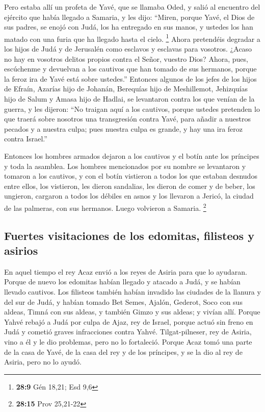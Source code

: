  Pero estaba allí un profeta de Yavé, que se llamaba Oded,
y salió al encuentro del ejército que había llegado a Samaria, y les
dijo: ``Miren, porque Yavé, el Dios de sus padres, se enojó con Judá,
los ha entregado en sus manos, y ustedes los han matado con una furia
que ha llegado hasta el cielo. \footnote{\textbf{28:9} Gén 18,21; Esd
  9,6}  Ahora pretendéis degradar a los hijos de Judá y
de Jerusalén como esclavos y esclavas para vosotros. ¿Acaso no hay en
vosotros delitos propios contra el Señor, vuestro Dios? 
Ahora, pues, escúchenme y devuelvan a los cautivos que han tomado de sus
hermanos, porque la feroz ira de Yavé está sobre ustedes.''
 Entonces algunos de los jefes de los hijos de Efraín,
Azarías hijo de Johanán, Berequías hijo de Meshillemot, Jehizquías hijo
de Salum y Amasa hijo de Hadlai, se levantaron contra los que venían de
la guerra,  y les dijeron: ``No traigan aquí a los
cautivos, porque ustedes pretenden lo que traerá sobre nosotros una
transgresión contra Yavé, para añadir a nuestros pecados y a nuestra
culpa; pues nuestra culpa es grande, y hay una ira feroz contra
Israel.''

 Entonces los hombres armados dejaron a los cautivos y el
botín ante los príncipes y toda la asamblea.  Los hombres
mencionados por su nombre se levantaron y tomaron a los cautivos, y con
el botín vistieron a todos los que estaban desnudos entre ellos, los
vistieron, les dieron sandalias, les dieron de comer y de beber, los
ungieron, cargaron a todos los débiles en asnos y los llevaron a Jericó,
la ciudad de las palmeras, con sus hermanos. Luego volvieron a Samaria.
\footnote{\textbf{28:15} Prov 25,21-22}

\hypertarget{fuertes-visitaciones-de-los-edomitas-filisteos-y-asirios}{%
\subsection{Fuertes visitaciones de los edomitas, filisteos y
asirios}\label{fuertes-visitaciones-de-los-edomitas-filisteos-y-asirios}}

 En aquel tiempo el rey Acaz envió a los reyes de Asiria
para que lo ayudaran.  Porque de nuevo los edomitas
habían llegado y atacado a Judá, y se habían llevado cautivos.
 Los filisteos también habían invadido las ciudades de la
llanura y del sur de Judá, y habían tomado Bet Semes, Ajalón, Gederot,
Soco con sus aldeas, Timná con sus aldeas, y también Gimzo y sus aldeas;
y vivían allí.  Porque Yahvé rebajó a Judá por culpa de
Ajaz, rey de Israel, porque actuó sin freno en Judá y cometió graves
infracciones contra Yahvé.  Tilgat-pilneser, rey de
Asiria, vino a él y le dio problemas, pero no lo fortaleció.
 Porque Acaz tomó una parte de la casa de Yavé, de la
casa del rey y de los príncipes, y se la dio al rey de Asiria, pero no
lo ayudó.

